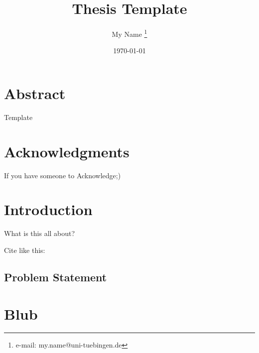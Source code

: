 \documentclass[a4paper,cleardoubleempty,BCOR1cm]{scrbook}
\title{Thesis Template}
\author{My Name \thanks{e-mail: my.name@uni-tuebingen.de}}
\date{\today}
\begin{document}


\chapter*{Abstract}
Template

\chapter*{Acknowledgments}
If you have someone to Acknowledge;)


\tableofcontents


\chapter{Introduction}
What is this all about?

Cite like this:\cite{agarwal2011}

\section{Problem Statement}











\appendix
\chapter{Blub}

%

\end{document}
